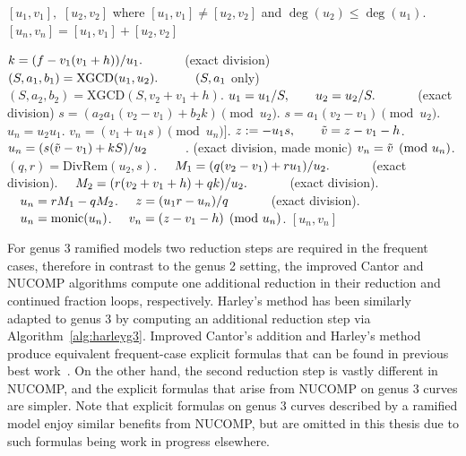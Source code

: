 \begin{algorithm}[htbp]
    \caption{Genus 3 Ramified Model Addition}
    \label{alg:g3nucomp}
    \begin{algorithmic}[1]
    \Require $[u_1,v_1],$ $[u_2,v_2]$ where $[u_1,v_1] \neq [u_2,v_2]$ and $\deg(u_2) \leq \deg(u_1)$.
    \Ensure $[u_n,v_n] = [u_1,v_1] + [u_2,v_2]$

    \State $k = (f - v_1(v_1 + h))/u_1. \quad\quad\quad$ (exact division)
    \State $(S,a_1,b_1) = \mathrm{XGCD}(u_1,u_2). \quad\quad\quad  (S, a_1$ only)
        \State $(S,a_2,b_2) = \mathrm{XGCD}(S,v_2 + v_1 + h)$.
            \State $u_1 = u_1/S, \quad\quad u_2 = u_2/S. \quad\quad\quad$ (exact division)
        \EndIf
        \State $s = (a_2a_1(v_2 - v_1) + b_2k) \pmod{u_2}$.
    \Else
        \State $s = a_1(v_2 - v_1) \pmod{u_2}$.
    \EndIf
        \State $u_n = u_2u_1$.
        \State $v_n = (v_1 + u_1s) \pmod{u_n}]$.
        \State $z := -u_1s, \quad\quad \tilde{v} = z - v_1 - h$.
        \State $u_n = (s(\tilde{v} - v_1) + kS)/u_2 \quad\quad\quad$. (exact division, made monic)
        \State $v_n = \tilde{v} \pmod{u_n}$.
    \Else\hspace{2pt} 
        \State $(q,r) = \mathrm{DivRem}(u_2,s)$.
        \State $\quad M_1 = (q(v_2 - v_1) + ru_1)/u_2. \quad\quad\quad$ (exact division).
        \State $\quad M_2 = (r(v_2 + v_1 + h) + qk)/u_2. \quad\quad\quad$ (exact division).
        \State $\quad u_n = rM_1 - qM_2$.
        \State $\quad z = (u_1r - u_n)/q \quad\quad\quad$ (exact division).
        \State $\quad u_n = \mathrm{monic}(u_n)$.
        \State $\quad v_n = (z - v_1 - h) \pmod{u_n}$.
    \EndIf
    \State \Return $[u_n,v_n]$
    \end{algorithmic}
    \end{algorithm}

For genus 3 ramified models two reduction steps are required in the frequent
cases, therefore in contrast to the genus 2 setting, the improved Cantor and
NUCOMP algorithms compute one additional reduction in their reduction and
continued fraction loops, respectively. Harley's method has been similarly
adapted to genus 3 by computing an additional reduction step via
Algorithm~\ref{alg:harleyg3}. Improved Cantor's addition and Harley's method
produce equivalent frequent-case explicit formulas that can be found in previous
best work~\cite{fan_g3_2006}. On the other hand, the second reduction step is
vastly different in NUCOMP, and the explicit formulas that arise from NUCOMP
on genus 3 curves are simpler. Note that explicit formulas on genus 3 curves
described by a ramified model enjoy similar benefits from NUCOMP, but are
omitted in this thesis due to such formulas being work in progress elsewhere.

